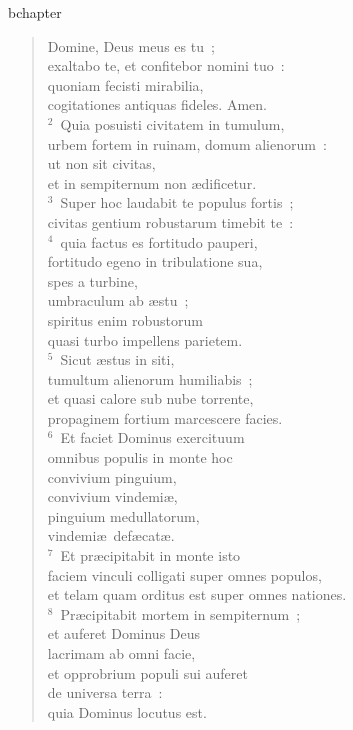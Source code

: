 bchapter\begin{verse}\vspace{-19pt}Domine, Deus meus es tu~;\\ exaltabo te, et confitebor nomini tuo~:\\ quoniam fecisti mirabilia,\\ cogitationes antiquas fideles. Amen.\\
${}^{2}$~Quia posuisti civitatem in tumulum,\\ urbem fortem in ruinam, domum alienorum~:\\ ut non sit civitas,\\ et in sempiternum non \ae dificetur.\\
${}^{3}$~Super hoc laudabit te populus fortis~;\\ civitas gentium robustarum timebit te~:\\
${}^{4}$~quia factus es fortitudo pauperi,\\ fortitudo egeno in tribulatione sua,\\ spes a turbine,\\ umbraculum ab \ae stu~;\\ spiritus enim robustorum\\ quasi turbo impellens parietem.\\
${}^{5}$~Sicut \ae stus in siti,\\ tumultum alienorum humiliabis~;\\ et quasi calore sub nube torrente,\\ propaginem fortium marcescere facies.\\
${}^{6}$~Et faciet Dominus exercituum\\ omnibus populis in monte hoc\\ convivium pinguium,\\ convivium vindemi\ae ,\\ pinguium medullatorum,\\ vindemi\ae\ def\ae cat\ae .\\
${}^{7}$~Et pr\ae cipitabit in monte isto\\ faciem vinculi colligati super omnes populos,\\ et telam quam orditus est super omnes nationes.\\
${}^{8}$~Pr\ae cipitabit mortem in sempiternum~;\\ et auferet Dominus Deus\\ lacrimam ab omni facie,\\ et opprobrium populi sui auferet\\ de universa terra~:\\ quia Dominus locutus est.\end{verse}


